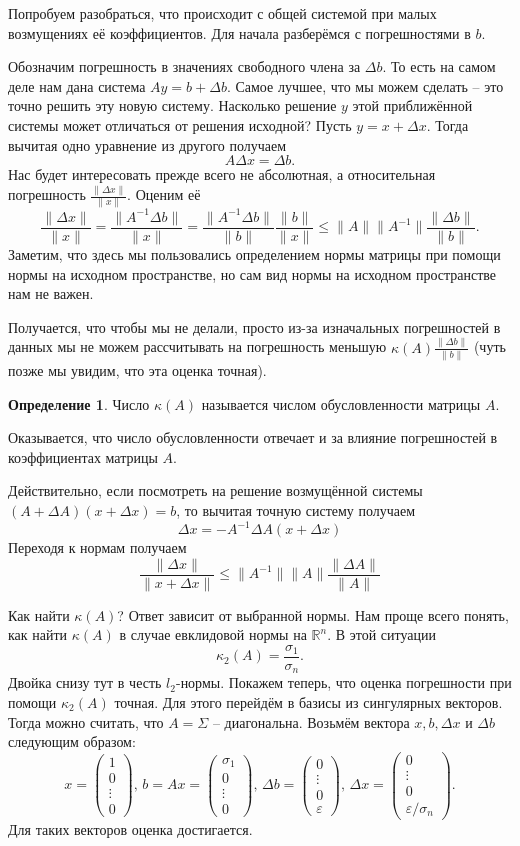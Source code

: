\documentclass[10pt,a4paper,oneside]{book}
\theoremstyle{definition}
\newtheorem*{defn}{\color{yellow!30!red} Определение}
\renewcommand{\leq}{\leqslant}
\newcommand{\mb}[1]{\mathbb{#1}}
\def\eps{\varepsilon}
\def\dfn{\begin{defn}}
\def\edfn{\end{defn}}
\def\pmat{\begin{pmatrix}}
\def\epmat{\end{pmatrix}}
\begin{document}
Попробуем разобраться, что происходит с общей системой при малых возмущениях её коэффициентов. Для начала разберёмся с погрешностями в $b$.

Обозначим погрешность в значениях свободного члена за $\Delta b$. То есть на самом деле нам дана система $Ay=b+\Delta b$. Самое лучшее, что мы можем сделать -- это точно решить эту новую систему. Насколько решение $y$ этой приближённой системы может отличаться от решения исходной? Пусть $y=x+\Delta x$. Тогда вычитая одно уравнение из другого получаем
$$A \Delta x= \Delta b.$$
Нас будет интересовать прежде всего не абсолютная, а относительная погрешность $\frac{\|\Delta x\|}{\|x\|}$. Оценим её
$$\frac{\|\Delta x\|}{\|x\|}=\frac{\|A^{-1} \Delta b \|}{\|x\|}=\frac{\|A^{-1} \Delta b \|}{\|b\|} \frac{\|b\|}{\|x\|} \leq \|A\| \|A^{-1}\| \frac{\|\Delta b\|}{\|b\|}.$$
Заметим, что здесь мы пользовались определением нормы матрицы при помощи нормы на исходном пространстве, но сам вид нормы на исходном пространстве нам не важен.

Получается, что чтобы мы не делали, просто из-за изначальных погрешностей в данных мы не можем рассчитывать  на погрешность меньшую $\kappa(A)\frac{\|\Delta b\|}{\|b\|}$
(чуть позже мы увидим, что эта оценка точная). 

\dfn Число $\kappa(A)$ называется числом обусловленности матрицы $A$.
\edfn

Оказывается, что число обусловленности отвечает и за влияние погрешностей в коэффициентах матрицы $A$.

Действительно, если посмотреть на решение возмущённой системы $(A+\Delta A)(x+\Delta x)=b$, то вычитая точную систему получаем
$$\Delta x= -A^{-1}\Delta A (x+\Delta x)$$
Переходя к нормам получаем
$$\frac{\|\Delta x\|}{\|x+\Delta x\|}\leq \|A^{-1}\| \|A\| \frac{\|\Delta A\|}{\|A\|}$$

Как найти $\kappa(A)$? Ответ зависит от выбранной нормы. Нам проще всего понять, как найти $\kappa(A)$ в случае евклидовой нормы на $\mb R^n$. В этой ситуации $$\kappa_2(A)=\frac{\sigma_1}{\sigma_n}.$$
Двойка снизу тут в честь $l_2$-нормы.
Покажем теперь, что оценка погрешности при помощи $\kappa_2(A)$ точная. Для этого перейдём в базисы из сингулярных векторов. Тогда можно считать, что $A=\Sigma$ -- диагональна. Возьмём вектора $x,b,\Delta x$ и $\Delta b$ следующим образом:
$$x=\pmat 1 \\ 0\\ \vdots \\ 0 \epmat,\, b=Ax=\pmat \sigma_1 \\ 0\\ \vdots \\ 0 \epmat, \, \Delta b = \pmat 0 \\ \vdots \\ 0 \\ \eps \epmat, \, \Delta x=  \pmat 0 \\  \vdots \\ 0 \\ \eps/\sigma_n\epmat.$$
Для таких векторов оценка достигается.
\end{document}
